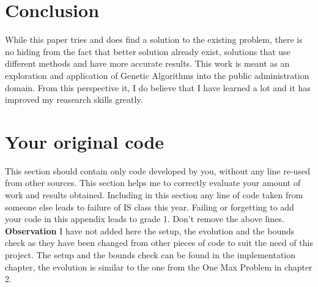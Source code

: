 \documentclass[a4paper,12pt]{report}
\begin{document}
\chapter{Conclusion}
While this paper tries and does find a solution to the existing problem, there is no hiding from the fact that better solution already exist, solutions that use different methods and have more accurate results\cite{sumedh2015gis}. This work is meant as an exploration and application of Genetic Algorithms into the public administration domain. From this perspective it, I do believe that I have learned a lot and it has improved my reasearch skills greatly.

\appendix

\chapter{Your original code}
\label{app:code}
This section should contain only code developed by you, without any line re-used from other sources. 
This section helps me to correctly evaluate your amount of work and results obtained. 
Including in this section any line of code taken from someone else leads to failure of IS class this year.
Failing or forgetting to add your code in this appendix leads to grade 1.
Don't remove the above lines.\\
\textbf{Observation}
I have not added here the setup, the evolution and the bounds check as they have been changed from other pieces of code\cite{doc} to suit the need of this project. The setup and the bounds check can be found in the implementation chapter, the evolution is similar to the one from the One Max Problem in chapter 2.
\end{document}
